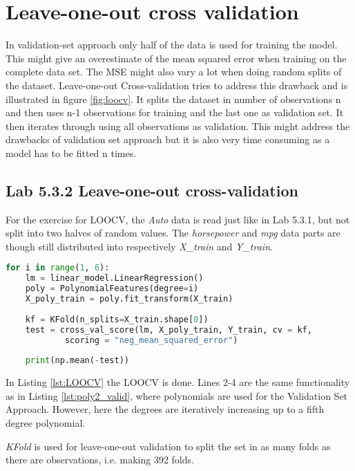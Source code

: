 \section{Leave-one-out cross validation}
In validation-set approach only half of the data is used for training the model. This might give an overestimate of the mean squared error when training on the complete data set. The MSE might also vary a lot when doing random splits of the dataset. Leave-one-out Cross-validation tries to address this drawback and is illustrated in figure \ref{fig:loocv}. It splits the dataset in number of observations n and then uses n-1 observations for training and the last one as validation set. It then iterates through using all observations as validation. This might address the drawbacks of validation set approach but it is also very time consuming as a model has to be fitted n times.


\subsection{Lab 5.3.2 Leave-one-out cross-validation}
For the exercise for LOOCV, the \emph{Auto} data is read just like in Lab 5.3.1, but not split into two halves of random values. The \emph{horsepower} and \emph{mpg} data parts are though still distributed into respectively \emph{X\_train} and \emph{Y\_train}. 

\begin{lstlisting}[language=Python, label=lst:LOOCV, caption=Leave-one-out Cross-validation loop]
for i in range(1, 6):
	lm = linear_model.LinearRegression()
	poly = PolynomialFeatures(degree=i)
	X_poly_train = poly.fit_transform(X_train)
	
	kf = KFold(n_splits=X_train.shape[0]) 
	test = cross_val_score(lm, X_poly_train, Y_train, cv = kf, 
			scoring = "neg_mean_squared_error")
	
	print(np.mean(-test))
\end{lstlisting}

In Listing \ref{lst:LOOCV} the LOOCV is done. Lines 2-4 are the same functionality as in Listing \ref{lst:poly2_valid}, where polynomials are used for the Validation Set Approach. However, here the degrees are iteratively increasing up to a fifth degree polynomial.

\emph{KFold} is used for leave-one-out validation to split the set in as many folds as there are observations, i.e. making 392 folds.

